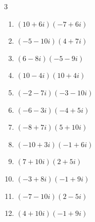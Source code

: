 \begin{multicols}{3}
\begin{enumerate}
        \phantom{$\displaystyle =7-9i$}

  \item $\displaystyle (10+6i)(-7+6i)$

        \phantom{$\displaystyle =-106+18i$}

\columnbreak %

\resetques

  \item $\displaystyle (-5-10i)(4+7i)$

        \phantom{$\displaystyle =50-75i$}

  \item $\displaystyle (6-8i)(-5-9i)$

        \phantom{$\displaystyle =-102-14i$}

  \item $\displaystyle (10-4i)(10+4i)$

        \phantom{$\displaystyle =116$}

  \item $\displaystyle (-2-7i)(-3-10i)$

        \phantom{$\displaystyle =-64+41i$}

  \item $\displaystyle (-6-3i)(-4+5i)$

        \phantom{$\displaystyle =39-18i$}

  \item $\displaystyle (-8+7i)(5+10i)$

        \phantom{$\displaystyle =-110-45i$}

  \item $\displaystyle (-10+3i)(-1+6i)$

        \phantom{$\displaystyle =-8-63i$}

  \item $\displaystyle (7+10i)(2+5i)$

        \phantom{$\displaystyle =-36+55i$}

  \item $\displaystyle (-3+8i)(-1+9i)$

        \phantom{$\displaystyle =-69-35i$}

  \item $\displaystyle (-7-10i)(2-5i)$

        \phantom{$\displaystyle =-64+15i$}

  \item $\displaystyle (4+10i)(-1+9i)$

        \phantom{$\displaystyle =-94+26i$}


\end{enumerate}
\end{multicols}
